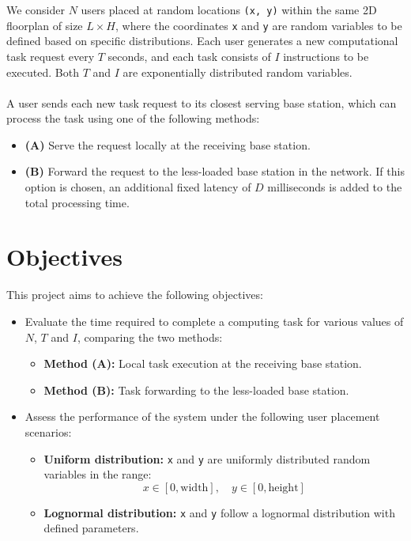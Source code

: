 \documentclass{report}
\begin{document}
We consider $N$ users placed at random locations \texttt{(x, y)} within the same 2D floorplan of size $L \times H$, where the coordinates \texttt{x} and \texttt{y} are random variables to be defined based on specific distributions. Each user generates a new computational task request every $T$ seconds, and each task consists of $I$ instructions to be executed. Both $T$ and $I$ are exponentially distributed random variables.\\\\
A user sends each new task request to its closest serving base station, which can process the task using one of the following methods:
\begin{itemize}
    \item \textbf{(A)} Serve the request locally at the receiving base station.
    \item \textbf{(B)} Forward the request to the less-loaded base station in the network. If this option is chosen, an additional fixed latency of $D$ milliseconds is added to the total processing time.
\end{itemize}

\section{Objectives}

This project aims to achieve the following objectives:
\begin{itemize}
    \item Evaluate the time required to complete a computing task for various values of $N$, $T$ and $I$, comparing the two methods:
    \begin{itemize}
        \item \textbf{Method (A):} Local task execution at the receiving base station.
        \item \textbf{Method (B):} Task forwarding to the less-loaded base station.
    \end{itemize}
    \item Assess the performance of the system under the following user placement scenarios:
    \begin{itemize}
        \item \textbf{Uniform distribution:} \texttt{x} and \texttt{y} are uniformly distributed random variables in the range:
        \[
        x \in [0, \text{width}], \quad y \in [0, \text{height}]
        \]
        \item \textbf{Lognormal distribution:} \texttt{x} and \texttt{y} follow a lognormal distribution with defined parameters.
    \end{itemize}
\end{itemize}
\end{document}
